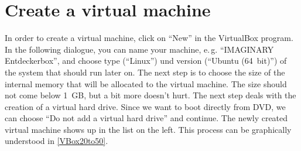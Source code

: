 \documentclass[a4paper,10pt,BCOR=0mm,DIV=14]{scrartcl}
\newcommand{\command}[1]{\textsf{\enquote{#1}}}
\begin{document}
\section{Create a virtual machine}
In order to create a virtual machine, click on \command{New} in the VirtualBox program. In the following dialogue, you can name your machine, e.\,g. \command{IMAGINARY Entdeckerbox}, and choose type (\command{Linux}) und version (\command{Ubuntu (64\, bit)}) of the system that should run later on. The next step is to choose the size of the internal memory that will be allocated to the virtual machine. The size should not come below 1\, GB, but a bit more doesn't hurt. The next step deals with the creation of a virtual hard drive. Since we want to boot directly from DVD, we can choose \command{Do not add a virtual hard drive} and continue. The newly created virtual machine shows up in the list on the left. This process can be graphically understood in \cref{VBox20to50}. 
\end{document}

